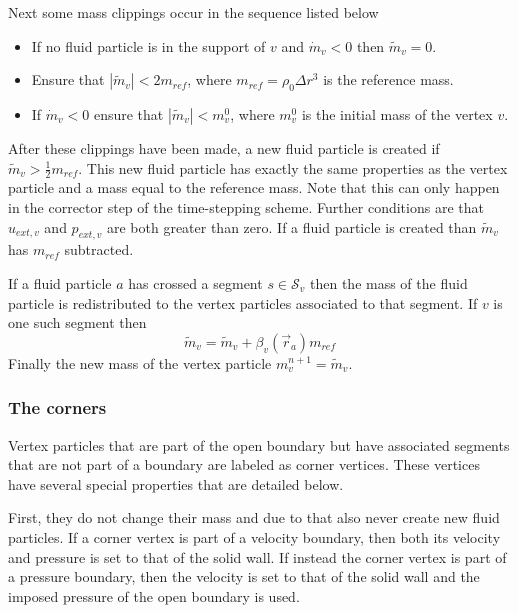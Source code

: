 Next some mass clippings occur in the sequence listed below
\begin{itemize}
\item If no fluid particle is in the support of $v$ and $\dot{m}_v < 0$
then $\widetilde{m}_v = 0$.
\item Ensure that $|\widetilde{m}_v| < 2 m_{ref}$, where $m_{ref} =
\rho_0 \Delta r^3$ is the reference mass.
\item If $\dot{m}_v < 0$ ensure that $|\widetilde{m}_v| < m^0_v$,
where $m^0_v$ is the initial mass of the vertex $v$.
\end{itemize}
After these clippings have been made, a new fluid particle is created if
$\widetilde{m}_v > \frac{1}{2}m_{ref}$. This new fluid particle has
exactly the same properties as the vertex particle and a mass equal to
the reference mass. Note that this can only happen in the corrector step
of the time-stepping scheme. Further conditions are that $u_{ext,v}$ and
$p_{ext,v}$ are both greater than zero. If a fluid particle is created
than $\widetilde{m}_v$ has $m_{ref}$ subtracted.

If a fluid particle $a$ has crossed a segment $s \in \mathcal{S}_v$ then
the mass of the fluid particle is redistributed to the vertex particles
associated to that segment. If $v$ is one such segment then
\begin{equation}
\widetilde{m}_v = \widetilde{m}_v + \beta_v(\vec{r}_a) m_{ref}
\label{e:open:splitfluid}
\end{equation}
Finally the new mass of the vertex particle $m^{n+1}_v =
\widetilde{m}_v$.

\subsubsection{The corners}
Vertex particles that are part of the open boundary but have associated
segments that are not part of a boundary are labeled as corner vertices.
These vertices have several special properties that are detailed below.

First, they do not change their mass and due to that also never create
new fluid particles. If a corner vertex is part of a velocity boundary,
then both its velocity and pressure is set to that of the solid wall.
If instead the corner vertex is part of a pressure boundary, then the
velocity is set to that of the solid wall and the imposed pressure of
the open boundary is used.

